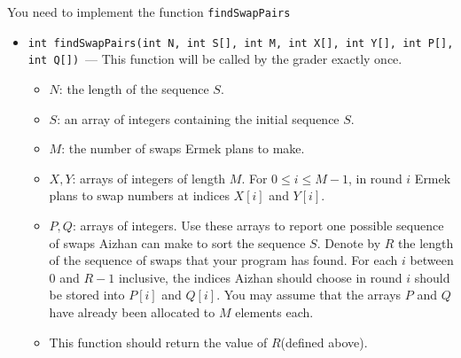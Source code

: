You need to implement the function \texttt{findSwapPairs}
\begin{itemize}
\item \texttt{int findSwapPairs(int N, int S[], int M, int X[], int Y[], int P[], int Q[])}~--- This function will be called by the grader exactly once.
\begin{itemize}
\item $N$: the length of the sequence $S$.
\item $S$: an array of integers containing the initial sequence $S$.
\item $M$: the number of swaps Ermek plans to make.
\item $X, Y$: arrays of integers of length $M$. For $0 \le i \le M - 1$, in round $i$ Ermek plans to swap numbers at indices $X[i]$ and $Y[i]$.
\item $P, Q$: arrays of integers. Use these arrays to report one possible sequence of swaps Aizhan can make to sort the sequence $S$. Denote by $R$ the length of the sequence of swaps that your program has found. For each $i$ between $0$ and $R - 1$ inclusive, the indices Aizhan should choose in round $i$ should be stored into $P[i]$ and $Q[i]$. You may assume that the arrays $P$ and $Q$ have already been allocated to $M$ elements each.
\item This function should return the value of $R$(defined above).
\end{itemize}
\end{itemize}